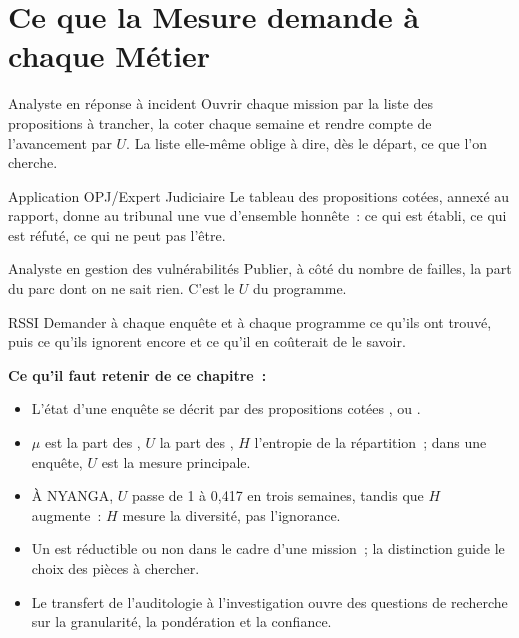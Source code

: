 \section{Ce que la Mesure demande à chaque Métier}
\label{sec:c16-metiers}

\begin{boxmetier}{Analyste en réponse à incident}
Ouvrir chaque mission par la liste des propositions à trancher, la coter
chaque semaine et rendre compte de l'avancement par $U$. La liste elle-même
oblige à dire, dès le départ, ce que l'on cherche.
\end{boxmetier}

\begin{boxmetier}{Application OPJ/Expert Judiciaire}
Le tableau des propositions cotées, annexé au rapport, donne au tribunal une
vue d'ensemble honnête~: ce qui est établi, ce qui est réfuté, ce qui ne
peut pas l'être.
\end{boxmetier}

\begin{boxmetier}{Analyste en gestion des vulnérabilités}
Publier, à côté du nombre de failles, la part du parc dont on ne sait rien.
C'est le $U$ du programme.
\end{boxmetier}

\begin{boxmetier}{RSSI}
Demander à chaque enquête et à chaque programme ce qu'ils ont trouvé, puis
ce qu'ils ignorent encore et ce qu'il en coûterait de le savoir.
\end{boxmetier}

\separateur

\begin{boxresume}
\textbf{Ce qu'il faut retenir de ce chapitre~:}
\begin{itemize}
    \item L'état d'une enquête se décrit par des propositions cotées
          \OUI{}, \NON{} ou \NEK{}.
    \item $\mu$ est la part des \OUI{}, $U$ la part des \NEK{}, $H$
          l'entropie de la répartition~; dans une enquête, $U$ est la mesure
          principale.
    \item À NYANGA, $U$ passe de 1 à 0,417 en trois semaines, tandis que
          $H$ augmente~: $H$ mesure la diversité, pas l'ignorance.
    \item Un \NEK{} est réductible ou non dans le cadre d'une mission~; la
          distinction guide le choix des pièces à chercher.
    \item Le transfert de l'auditologie à l'investigation ouvre des
          questions de recherche sur la granularité, la pondération et la
          confiance.
\end{itemize}
\end{boxresume}

